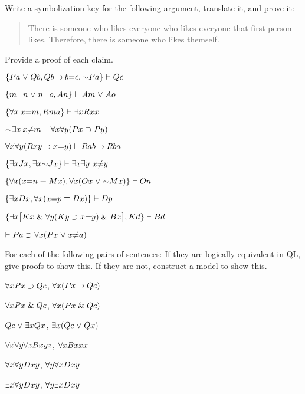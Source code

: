 \solutions
\problempart
\label{pr.likes}
Write a symbolization key for the following argument, translate it, and prove it:
\begin{quote}
There is someone who likes everyone who likes everyone that first person likes. Therefore, there is someone who likes themself.
\end{quote}

\problempart
\label{pr.identity}
Provide a proof of each claim.
\begin{earg}
\item $\{Pa \eor Qb, Qb \eif b{=}c, \enot Pa\}\vdash Qc$
\item $\{m{=}n \mkern1mu\vee\mkern1mu n{=}o, An\}\vdash Am \mkern1mu\vee\mkern1mu Ao$
\item $\{\forall x \: x{=}m, Rma\}\vdash \exists x Rxx$
\item $\enot \qt{\exists}{x} \: x {\neq} m \vdash \qt{\forall}{x}\qt{\forall}{y} (Px \eif Py)$
\item $\forall x\forall y(Rxy \supset x{=}y)\vdash Rab \supset Rba$
\item $\{\qt{\exists}{x} Jx, \qt{\exists}{x} \enot Jx\}\vdash \qt{\exists}{x} \qt{\exists}{y}\ x{\neq} y$
\item $\{\qt{\forall}{x}(x{=}n \eiff Mx), \qt{\forall}{x}(Ox \eor \enot Mx)\}\vdash On$
\item $\{\exists x Dx, \forall x(x{=}p \equiv Dx)\}\vdash Dp$
\item $\{\exists x\bigl[Kx \mathrel\& \forall y(Ky \supset x{=}y) \mathrel\& Bx\bigr], Kd\}\vdash Bd$
\item $\vdash Pa \supset \forall x(Px \mkern1mu\vee\mkern1mu x {\neq} a)$
\end{earg}



\solutions
\problempart
\label{pr.QLequivornot}
For each of the following pairs of sentences: If they are logically equivalent in QL, give proofs to show this. If they are not, construct a model to show this.
\begin{earg}
\item $\forall x Px \supset Qc$, $\forall x (Px \supset Qc)$
\item $\forall x Px \mathrel\& Qc$, $\forall x (Px \mathrel\& Qc)$
\item $Qc \mkern1mu\vee\mkern1mu \exists x Qx$, $\exists x (Qc \mkern1mu\vee\mkern1mu Qx)$
\item $\forall x\forall y \forall z Bxyz$, $\forall x Bxxx$
\item $\forall x\forall y Dxy$, $\forall y\forall x Dxy$
\item $\exists x\forall y Dxy$, $\forall y\exists x Dxy$
\end{earg}

